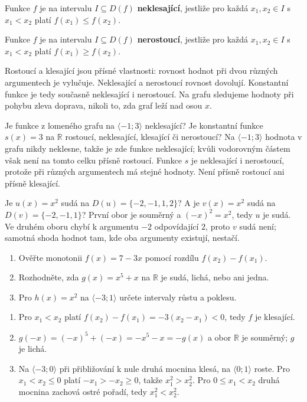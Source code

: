 \documentclass[11pt,a4paper]{article}
\begin{document}
\begin{definiceBox}
Funkce $f$ je na intervalu $I\subseteq D(f)$ \textbf{neklesající}, jestliže pro každá $x_1,x_2\in I$ s $x_1<x_2$ platí $f(x_1)\le f(x_2)$.
\end{definiceBox}
\begin{definiceBox}
Funkce $f$ je na intervalu $I\subseteq D(f)$ \textbf{nerostoucí}, jestliže pro každá $x_1,x_2\in I$ s $x_1<x_2$ platí $f(x_1)\ge f(x_2)$.
\end{definiceBox}
Rostoucí a klesající jsou přísné vlastnosti: rovnost hodnot při dvou různých argumentech je vylučuje. Neklesající a nerostoucí rovnost dovolují. Konstantní funkce je tedy současně neklesající i nerostoucí. Na grafu sledujeme hodnoty při pohybu zleva doprava, nikoli to, zda graf leží nad osou $x$.
\begin{prikladReseniBox}
Je funkce z lomeného grafu na $\langle-1;3\rangle$ neklesající? Je konstantní funkce $s(x)=3$ na $\mathbb R$ rostoucí, neklesající, klesající či nerostoucí?
\tcblower
Na $\langle-1;3\rangle$ hodnota v grafu nikdy neklesne, takže je zde funkce neklesající; kvůli vodorovným částem však není na tomto celku přísně rostoucí. Funkce $s$ je neklesající i nerostoucí, protože při různých argumentech má stejné hodnoty. Není přísně rostoucí ani přísně klesající.
\end{prikladReseniBox}
\begin{zadaniReseniBox}
Je $u(x)=x^2$ sudá na $D(u)=\{-2,-1,1,2\}$? A je $v(x)=x^2$ sudá na $D(v)=\{-2,-1,1\}$?
\tcblower
První obor je souměrný a $(-x)^2=x^2$, tedy $u$ je sudá. Ve druhém oboru chybí k argumentu $-2$ odpovídající $2$, proto $v$ sudá není; samotná shoda hodnot tam, kde oba argumenty existují, nestačí.
\end{zadaniReseniBox}
\begin{zadaniReseniBox}
\begin{enumerate}[label=\alph*)]
\item Ověřte monotonii $f(x)=7-3x$ pomocí rozdílu $f(x_2)-f(x_1)$.
\item Rozhodněte, zda $g(x)=x^5+x$ na $\mathbb R$ je sudá, lichá, nebo ani jedna.
\item Pro $h(x)=x^2$ na $\langle-3;1\rangle$ určete intervaly růstu a poklesu.
\end{enumerate}
\tcblower
\begin{enumerate}[label=\alph*)]
\item Pro $x_1<x_2$ platí $f(x_2)-f(x_1)=-3(x_2-x_1)<0$, tedy $f$ je klesající.
\item $g(-x)=(-x)^5+(-x)=-x^5-x=-g(x)$ a obor $\mathbb R$ je souměrný; $g$ je lichá.
\item Na $\langle-3;0\rangle$ při přibližování k nule druhá mocnina klesá, na $\langle0;1\rangle$ roste. Pro $x_1<x_2\le0$ platí $-x_1>-x_2\ge0$, takže $x_1^2>x_2^2$. Pro $0\le x_1<x_2$ druhá mocnina zachová ostré pořadí, tedy $x_1^2<x_2^2$.
\end{enumerate}
\end{zadaniReseniBox}
\end{document}

